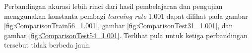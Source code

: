 \begin{adjustbox}{width=1\textwidth}
\noindent\begin{minipage}{\linewidth}
	\label{fig:ComparisonTest31_1.1287}
\end{minipage}
\end{adjustbox}

\begin{adjustbox}{width=1\textwidth}
\noindent\begin{minipage}{\linewidth}
	\label{fig:ComparisonTest54_1.1287}
\end{minipage}
\end{adjustbox}

\noindent Perbandingan akurasi lebih rinci dari hasil pembelajaran dan pengujian menggunakan konstanta pembagi \textit{learning rate} 1,001 dapat dilihat pada gambar \ref{fig:ComparisonTrain56_1.001}, gambar \ref{fig:ComparisonTest31_1.001}, dan gambar \ref{fig:ComparisonTest54_1.001}. Terlihat pula untuk ketiga perbandingan tersebut tidak berbeda jauh.\\

